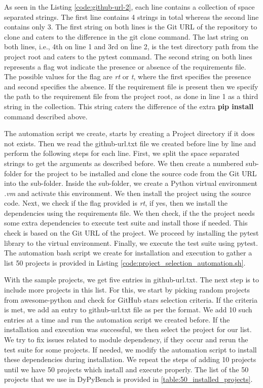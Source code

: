 As seen in the Listing \ref{code:github-url-2}, each line contains a collection of space separated strings.
The first line contains 4 strings in total whereas the second line contains only 3.
The first string on both lines is the Git URL of the repository to clone and caters to the difference in the git clone command.
The last string on both lines, i.e., 4th on line 1 and 3rd on ĺine 2, is the test directory path from the project root and caters to the pytest command.
The second string on both lines represents a flag wot indicate the presence or absence of the requirements file.
The possible values for the flag are \textit{rt} or \textit{t}, where the first specifies the presence and second specifies the absence.
If the requirement file is present then we specify the path to the requirement file from the project root, as done in line 1 as a third string in the collection. 
This string caters the difference of the extra \textbf{pip install} command described above. 

The automation script we create, starts by creating a Project directory if it does not exists.
Then we read the github-url.txt file we created before line by line and perform the following steps for each line.
First, we split the space separated strings to get the arguments as described before.
We then create a numbered sub-folder for the project to be installed and clone the source code from the Git URL into the sub-folder.
Inside the sub-folder, we create a Python virtual environment \textit{.vm} and activate this environment.
We then install the project using the source code.
Next, we check if the flag provided is \textit{rt}, if yes, then we install the dependencies using the requirements file.
We then check, if the the project needs some extra dependencies to execute test suite and install those if needed.
This check is based on the Git URL of the project.
We proceed by installing the pytest library to the virtual environment.
Finally, we execute the test suite using pytest.
The automation bash script we create for installation and execution to gather a list 50 projects is provided in Listing \ref{code:project_selection_automation.sh}.

With the sample projects, we get five entries in github-url.txt.
The next step is to include more projects in this list.
For this, we start by picking random projects from awesome-python and check for GitHub stars selection criteria.
If the criteria is met, we add an entry to github-url.txt file as per the format.
We add 10 such entries at a time and run the automation script we created before.
If the installation and execution was successful, we then select the project for our list.
We try to fix issues related to module dependency, if they occur and rerun the test suite for some projects.
If needed, we modify the automation script to install these dependencies during installation. 
We repeat the steps of adding 10 projects until we have 50 projects which install and execute properly.
The list of the 50 projects that we use in DyPyBench is provided in \ref{table:50_installed_projects}.

